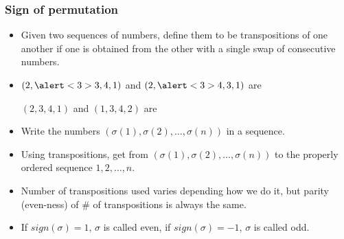 \begin{frame}
\frametitle{Sign of permutation}
\begin{itemize}
\item Given two sequences of numbers, define them to be transpositions of one another if one is obtained from the other with a \alert<1>{single swap of consecutive numbers}.
\item<2-> \alert<2>{$(2,\alert<3>{3,4},1) $ and $(2,\alert<3>{4,3},1) $ are} 

\alert<4>{$(2,3,4,1) $ and $(1,3,4,2) $ are} 
\item<6-> Write the numbers $\left(\sigma(1),\sigma(2), \dots, \sigma(n)\right)$ in a sequence. 
\item<7-> Using transpositions, get from $\left(\sigma(1),\sigma(2), \dots, \sigma(n)\right)$ to the properly ordered sequence $1,2,\dots, n$.
\item<8-> Number of transpositions used varies depending how we do it, but parity (even-ness) of \# of transpositions is always the same.
\item<10-> If $sign(\sigma)=1$,  $\sigma$ is called even, if $sign(\sigma)=-1$, $\sigma$ is called odd.
\end{itemize}
\end{frame}